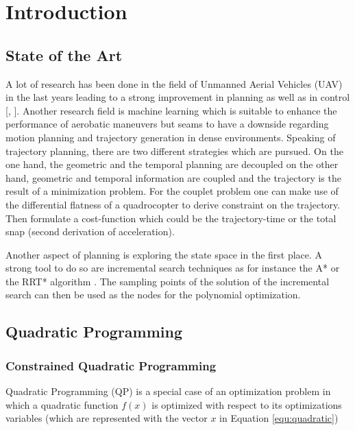 
\chapter{Introduction}\label{sec:introduction}

\section{State of the Art}\label{sec:state}

A lot of research has been done in the field of Unmanned Aerial Vehicles (UAV) in the last years leading to a strong improvement in planning \cite{he} as well as in control [\cite{colling}, \cite{hehn}].  Another research field is machine learning \cite{lup} which is suitable to enhance the performance of aerobatic maneuvers but seams to have a downside regarding motion planning and trajectory generation in dense environments. \newline
Speaking of trajectory planning, there are two different strategies which are pursued. On the one hand, the geometric and the temporal planning are decoupled  \cite{bou} on the other hand, geometric and temporal information are coupled and the trajectory is the result of a minimization problem. For the couplet problem one can make use of the differential flatness of a quadrocopter to derive constraint on the trajectory. Then formulate a cost-function which could be the trajectory-time \cite{hehn} or the total snap \cite{mellinger} (second derivation of acceleration). \newline

Another aspect of planning is exploring the state space in the first place. A strong tool to do so are incremental search techniques as for instance the A* \cite{lik} or the RRT* algorithm \cite{richter}. The sampling points of the solution of the incremental search can then be used as the nodes for the polynomial optimization.

\section{Quadratic Programming}\label{sec:quadratic}

\subsection{Constrained Quadratic Programming}

Quadratic Programming (QP) is a special case of an optimization problem in which a quadratic function $f(x)$ is optimized with respect to its optimizations variables (which are represented with the vector $x$ in Equation \ref{equ:quadratic})

